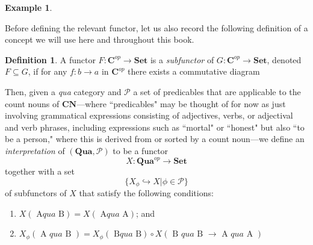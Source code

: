 \documentclass[11pt]{book}
\theoremstyle{definition}
\newtheorem{example}{Example}[section]
\theoremstyle{definition}
\newtheorem{definition}{Definition}[section]
\theoremstyle{definition}
\theoremstyle{theorem}
\theoremstyle{definition}
\begin{document}
\begin{example}
	\begin{center}
	\end{center}
Before defining the relevant functor, let us also record the following definition of a concept we will use here and throughout this book. 
\begin{definition}
	A functor $F: \textbf{C}^{op} \rightarrow \textbf{Set}$ is a \textit{subfunctor}  of $G: \textbf{C}^{op} \rightarrow \textbf{Set}$, denoted $F \subseteq  G$, if for any $f: b \rightarrow a$ in $\textbf{C}^{op}$ there exists a commutative diagram 
	\begin{center}
	\end{center} 
\end{definition}
	\noindent 
Then, given a \textit{qua} category and $\mathscr{P}$ a set of predicables that are applicable to the count nouns of $\textbf{CN}$---where ``predicables" may be thought of for now as just involving grammatical expressions consisting of adjectives, verbs, or adjectival and verb phrases, including expressions such as ``mortal" or ``honest" but also ``to be a person," where this is derived from or sorted by a count noun---we define an \textit{interpretation} of $(\textbf{Qua}, \mathscr{P})$ to be a functor 
		\begin{equation}
		X: \textbf{Qua}^{op} \rightarrow \textbf{Set}
		\end{equation}
		together with a set 
		\begin{equation}
		\{X_{\phi} \hookrightarrow X | \phi \in \mathscr{P}\}
		\end{equation}
		of subfunctors of $X$ that satisfy the following conditions: 
		\begin{enumerate}
			\item $X(\boxed{\text{ A}}qua \boxed{\text{ B}}) = X(\boxed{\text{ A}}qua \boxed{\text{ A}})$; and 
			\item $X_{\phi}(\boxed{\text{ A }}qua \boxed{\text{ B }}) = X_{\phi}(\boxed{\text{ B}}qua \boxed{\text{ B}}) \circ X(\boxed{\text{ B }}qua\boxed{\text{ B }} \rightarrow \boxed{\text{ A }}qua\boxed{\text{ A }})$

\end{enumerate}
\end{example}
\end{document}
